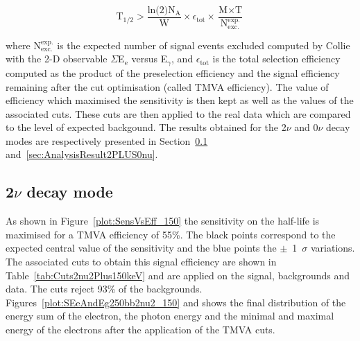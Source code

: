 \documentclass[main.tex]{subfiles}
\begin{document}
\begin{equation}\label{sec:SensitivityFormula}
\text{T}_{\text{1/2}} > \frac{\text{ln(2)} \text{N}_\text{A}}{\text{W}} \times \epsilon_{\text{tot}} \times \frac{\text{M} \times \text{T}}{\text{N}_{\text{exc.}}^{\text{exp.}}}
\end{equation}


\bigskip


\NI where $\text{N}_{\text{exc.}}^{\text{exp.}}$ is the expected number of signal events excluded computed by Collie with the 2-D observable $\Sigma$E$_\text{e}$ versus E$_{\gamma}$, and $\epsilon_{\text{tot}}$ is the total selection efficiency computed as the product of the preselection efficiency and the signal efficiency remaining after the cut optimisation (called TMVA efficiency). The value of efficiency which maximised the sensitivity is then kept as well as the values of the associated cuts. These cuts are then applied to the real data which are compared to the level of expected backgound. The results obtained for the 2$\nu$ and 0$\nu$ decay modes are respectively presented in Section~\ref{sec:AnalysisResult2PLUS2nu} and~\ref{sec:AnalysisResult2PLUS0nu}. 


\FloatBarrier


\subsection{2$\nu$ decay mode}\label{sec:AnalysisResult2PLUS2nu}


\NI As shown in Figure~\ref{plot:SensVsEff_150} the sensitivity on the half-life is maximised for a TMVA efficiency of 55\%.  The black points correspond to the expected central value of the sensitivity and the blue points the $\pm$~1~$\sigma$ variations. The associated cuts to obtain this signal efficiency are shown in Table~\ref{tab:Cuts2nu2Plus150keV} and are applied on the signal, backgrounds and data. The cuts reject 93\% of the backgrounds. Figures~\ref{plot:SEeAndEg250bb2nu2_150} and shows the final distribution of the energy sum of the electron, the photon energy and the minimal and maximal energy of the electrons after the application of the TMVA cuts.
\end{document}
